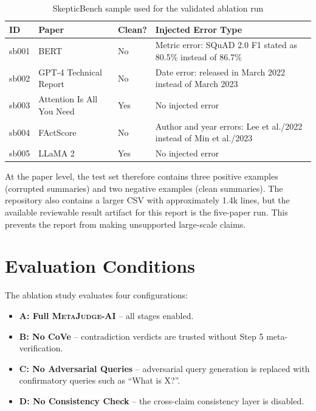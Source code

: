 \documentclass[12pt, a4paper]{report}
\newcommand{\sys}{\textsc{MetaJudge-AI}}
\begin{document}
\begin{table}[h!]
\centering
\caption{SkepticBench sample used for the validated ablation run}
\label{tab:dataset}
\renewcommand{\arraystretch}{1.25}
\begin{tabularx}{\textwidth}{L{1.2cm} L{4.2cm} C{1.8cm} X}
\toprule
\textbf{ID} & \textbf{Paper} & \textbf{Clean?} & \textbf{Injected Error Type} \\
\midrule
{}
sb001 & BERT & No & Metric error: SQuAD 2.0 F1 stated as 80.5\% instead of 86.7\% \\
sb002 & GPT-4 Technical Report & No & Date error: released in March 2022 instead of March 2023 \\
sb003 & Attention Is All You Need & Yes & No injected error \\
sb004 & FActScore & No & Author and year errors: Lee et al./2022 instead of Min et al./2023 \\
sb005 & LLaMA 2 & Yes & No injected error \\
\bottomrule
\end{tabularx}
\end{table}

At the paper level, the test set therefore contains three positive examples
(corrupted summaries) and two negative examples (clean summaries). The repository
also contains a larger CSV with approximately 1.4k lines, but the available
reviewable result artifact for this report is the five-paper run. This prevents
the report from making unsupported large-scale claims.

\section{Evaluation Conditions}

The ablation study evaluates four configurations:

\begin{itemize}
    \item \textbf{A: Full \sys{}} -- all stages enabled.
    \item \textbf{B: No CoVe} -- contradiction verdicts are trusted without Step 5 meta-verification.
    \item \textbf{C: No Adversarial Queries} -- adversarial query generation is replaced with confirmatory queries such as ``What is X?''.
    \item \textbf{D: No Consistency Check} -- the cross-claim consistency layer is disabled.
\end{itemize}
\end{document}
